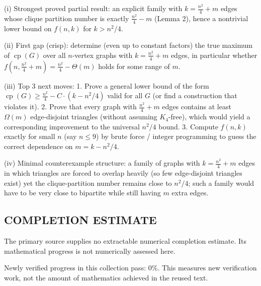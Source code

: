 (i) Strongest proved partial result: an explicit family with $k=\frac{n^2}{4}+m$ edges whose clique partition number is exactly $\frac{n^2}{4}-m$ (Lemma 2), hence a nontrivial lower bound on $f(n,k)$ for $k>n^2/4$.

(ii) First gap (crisp): determine (even up to constant factors) the true maximum of $\operatorname{cp}(G)$ over all $n$-vertex graphs with $k=\frac{n^2}{4}+m$ edges, in particular whether $f(n,\frac{n^2}{4}+m)=\frac{n^2}{4}-\Theta(m)$ holds for some range of $m$.

(iii) Top 3 next moves:
1. Prove a general lower bound of the form $\operatorname{cp}(G)\ge \frac{n^2}{4}-C\cdot (k-n^2/4)$ valid for all $G$ (or find a construction that violates it).
2. Prove that every graph with $\frac{n^2}{4}+m$ edges contains at least $\Omega(m)$ edge-disjoint triangles (without assuming $K_4$-free), which would yield a corresponding improvement to the universal $n^2/4$ bound.
3. Compute $f(n,k)$ exactly for small $n$ (say $n\le 9$) by brute force / integer programming to guess the correct dependence on $m=k-n^2/4$.

(iv) Minimal counterexample structure: a family of graphs with $k=\frac{n^2}{4}+m$ edges in which triangles are forced to overlap heavily (so few edge-disjoint triangles exist) yet the clique-partition number remains close to $n^2/4$; such a family would have to be very close to bipartite while still having $m$ extra edges.




\subsection*{COMPLETION ESTIMATE}
The primary source supplies no extractable numerical completion estimate. Its mathematical progress is not numerically assessed here.

Newly verified progress in this collection pass: $0\%$. This measures new verification work, not the amount of mathematics achieved in the reused text.
